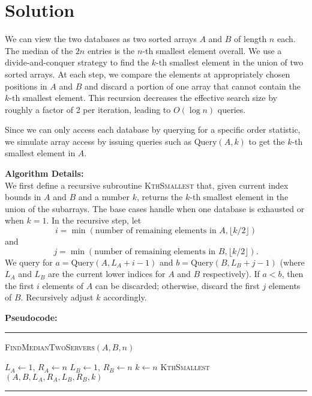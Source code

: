 \documentclass[11pt]{article}
\begin{document}
    \section*{Solution}
    We can view the two databases as two sorted arrays \( A \) and \( B \) of length \( n \) each.  
    The median of the \( 2n \) entries is the \( n \)-th smallest element overall.  
    We use a divide-and-conquer strategy to find the \( k \)-th smallest element in the union of two sorted arrays. 
    At each step, we compare the elements at appropriately chosen positions in \( A \) and \( B \) and discard a portion of one array that cannot contain the \( k \)-th smallest element. 
    This recursion decreases the effective search size by roughly a factor of 2 per iteration, leading to \( O(\log n) \) queries.
    
    Since we can only access each database by querying for a specific order statistic, we simulate array access by issuing queries such as \(\text{Query}(A, k)\) to get the \( k \)-th smallest element in \( A \).
    
    \bigskip
    
    \textbf{Algorithm Details:} \\
    We first define a recursive subroutine \textsc{KthSmallest} that, given current index bounds in \( A \) and \( B \) and a number \( k \), returns the \( k \)-th smallest element in the union of the subarrays. The base cases handle when one database is exhausted or when \( k = 1 \). In the recursive step, let
    \[
    i = \min(\text{number of remaining elements in } A, \lfloor k/2 \rfloor)
    \]
    and
    \[
    j = \min(\text{number of remaining elements in } B, \lfloor k/2 \rfloor).
    \]
    We query for \( a = \text{Query}(A, L_A+i-1) \) and \( b = \text{Query}(B, L_B+j-1) \) (where \( L_A \) and \( L_B \) are the current lower indices for \( A \) and \( B \) respectively). If \( a < b \), then the first \( i \) elements of \( A \) can be discarded; otherwise, discard the first \( j \) elements of \( B \). Recursively adjust \( k \) accordingly.
    
    \bigskip
    
    \textbf{Pseudocode:}
    
    \par\noindent\rule{\textwidth}{0.4pt}
    \smallskip        
    \textsc{FindMedianTwoServers}$(A, B, n)$
    \begin{algorithmic}[1]
        \STATE $L_A \gets 1$, $R_A \gets n$
        \STATE $L_B \gets 1$, $R_B \gets n$
        \STATE $k \gets n$
        \RETURN \textsc{KthSmallest}$(A, B, L_A, R_A, L_B, R_B, k)$
    \end{algorithmic}
    \vspace{-2mm}
    \par\noindent\rule{\textwidth}{0.4pt}
    
\end{document}
